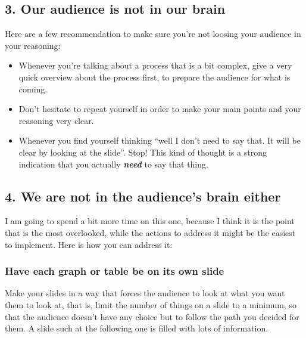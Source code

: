 \documentclass[
  titlepage]{book}
\providecommand{\tightlist}{%
  \setlength{\itemsep}{0pt}\setlength{\parskip}{0pt}}
\begin{document}
\hypertarget{our-audience-is-not-in-our-brain}{%
\subsection{3. Our audience is not in our brain}\label{our-audience-is-not-in-our-brain}}

Here are a few recommendation to make sure you're not loosing your audience in your reasoning:

\begin{itemize}
\tightlist
\item
  Whenever you're talking about a process that is a bit complex, give a very quick overview about the process first, to prepare the audience for what is coming.\\
\item
  Don't hesitate to repeat yourself in order to make your main points and your reasoning very clear.\\
\item
  Whenever you find yourself thinking ``well I don't need to say that. It will be clear by looking at the slide''. Stop! This kind of thought is a strong indication that you actually \textbf{\emph{need}} to say that thing.
\end{itemize}

\hypertarget{we-are-not-in-the-audiences-brain-either}{%
\subsection{4. We are not in the audience's brain either}\label{we-are-not-in-the-audiences-brain-either}}

I am going to spend a bit more time on this one, because I think it is the point that is the most overlooked, while the actions to address it might be the easiest to implement. Here is how you can address it:

\hypertarget{have-each-graph-or-table-be-on-its-own-slide}{%
\subsubsection{Have each graph or table be on its own slide}\label{have-each-graph-or-table-be-on-its-own-slide}}

Make your slides in a way that forces the audience to look at what you want them to look at, that is, limit the number of things on a slide to a minimum, so that the audience doesn't have any choice but to follow the path you decided for them. A slide such at the following one is filled with lots of information.
\end{document}
